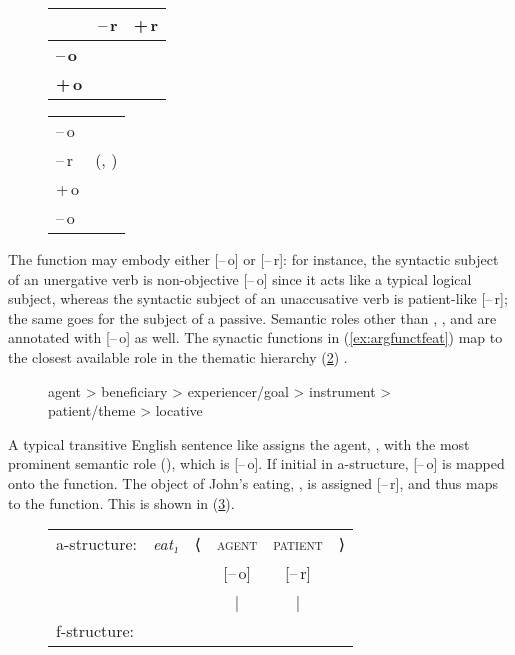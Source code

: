 \begin{figure}[h]
\pex\label{ex:argfunctfeat}
\a\label{ex:argfunctfeat_1}%
	\begin{tabu}[t]{>{\bfseries}l c c}
	& \textbf{–\,r}
	& \textbf{+\,r}
	\\

	\midrule

	–\,o
	& \Subj
	& \Oblique
	\\

	+\,o
	& \Obj
	& \SObj
	\\

	\bottomrule
	\end{tabu}

\a\label{ex:argfunctfeat_2}%
	\begin{tabular}[t]{@{} l @{\quad$\mapsto$\quad} l}
	–\,o	&	\Subj\\
	–\,r	&	\Obj(, \Subj)\\
	+\,o	&	\SObj\\
	–\,o	&	\Oblique\\
	\end{tabular}
\xe
\end{figure}

The \Subj{} function may embody either [–\,o] or [–\,r]: for instance, the
syntactic subject of an unergative verb is non-objective [–\,o] since it acts
like a typical logical subject, whereas the syntactic subject of an
unaccusative verb is patient-like \mbox{[–\,r]}; the same goes for the subject
of a passive. Semantic roles other than \Subj{}, \Obj{}, and \SObj{} are
annotated with [–\,o] as well. The synactic functions in
(\ref{ex:argfunctfeat}) map to the closest available role in the thematic
hierarchy (\ref{ex:themhier2}) \citep[329]{bresnan2016}.

\begin{figure}[h]
\ex\label{ex:themhier2}%
	agent > beneficiary > experiencer/goal > instrument > patient/theme >
	locative
\xe
\end{figure}

A typical transitive English sentence like  assigns
the agent, , with the most prominent semantic role (\thetaroof), which
is [–\,o]. If initial in a-structure, [–\,o] is mapped onto the \Subj{}
function. The object of John's eating, , is assigned [–\,r], and
thus maps to the \Obj{} function. This is shown in (\ref{ex:engactive}).

\begin{figure}[h]
\ex\label{ex:engactive}
\begin{tabular}[t]{l >{\itshape}l l c c r}
a-structure:
	& eat₁
	& ⟨
	& \textsc{agent}
	& \textsc{patient}
	& ⟩
	\\
%
	& %
	& %
	& [–\,o]
	& [–\,r]
	& %
	\\

%
	& %
	& %
	& |
	& |
	& %
	\\

f-structure:
	& %
	& %
	& \Subj
	& \Obj
	& %
	\\
\end{tabular}
\xe
\end{figure}

